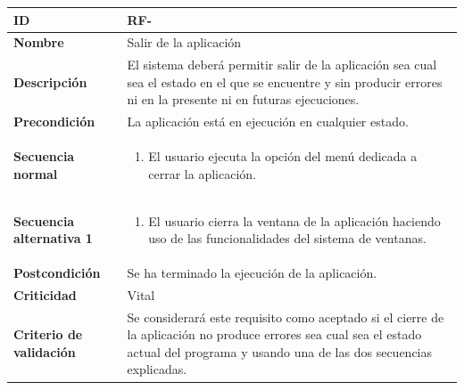 \begin{center}
	\begin{tabular}{ | p{4.7cm} | p{10cm} | } 
		\hline
		
		\textbf{ID} & RF-\arabic{contador_requisitos_funcionales}
		{contador_requisitos_funcionales} \\
		
		\hline 
		\textbf{Nombre} &
		Salir de la aplicación\\ 
		
		\hline
		\textbf{Descripción} & 
		El sistema deberá permitir salir de la aplicación sea cual sea el estado en el que se encuentre y sin producir errores ni en la presente ni en futuras ejecuciones.\\
		
		\hline
		\textbf{Precondición} & 
		La aplicación está en ejecución en cualquier estado.\\
		
		\hline
		\textbf{Secuencia normal} &
		\begin{enumerate}
			\item El usuario ejecuta la opción del menú dedicada a cerrar la aplicación.
		\end{enumerate}
		\\
		
		\hline
		\textbf{Secuencia alternativa 1} &
		\begin{enumerate}
			\item El usuario cierra la ventana de la aplicación haciendo uso de las funcionalidades del sistema de ventanas.
		\end{enumerate}
		\\
		
		\hline
		\textbf{Postcondición} & 
		Se ha terminado la ejecución de la aplicación.\\
		
		\hline 
		\textbf{Criticidad} &
		Vital\\
		
		\hline 
		\textbf{Criterio de validación} & 
		Se considerará este requisito como aceptado si el cierre de la aplicación no produce errores sea cual sea el estado actual del programa y usando una de las dos secuencias explicadas.\\
		
		\hline
	\end{tabular}
\end{center}

